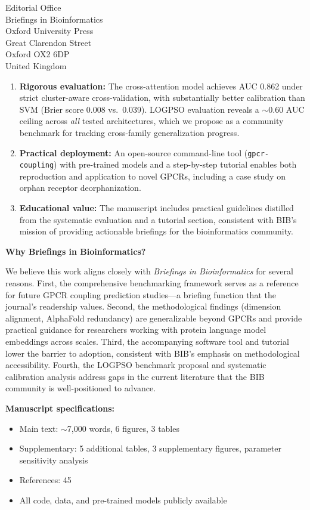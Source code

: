 \documentclass[11pt]{letter}
\begin{document}
\begin{letter}{Editorial Office\\
Briefings in Bioinformatics\\
Oxford University Press\\
Great Clarendon Street\\
Oxford OX2 6DP\\
United Kingdom}
\begin{enumerate}
    \item \textbf{Rigorous evaluation:} The cross-attention model achieves AUC 0.862 under strict cluster-aware cross-validation, with substantially better calibration than SVM (Brier score 0.008 vs.\ 0.039). LOGPSO evaluation reveals a $\sim$0.60 AUC ceiling across \textit{all} tested architectures, which we propose as a community benchmark for tracking cross-family generalization progress.

    \item \textbf{Practical deployment:} An open-source command-line tool (\texttt{gpcr-coupling}) with pre-trained models and a step-by-step tutorial enables both reproduction and application to novel GPCRs, including a case study on orphan receptor deorphanization.

    \item \textbf{Educational value:} The manuscript includes practical guidelines distilled from the systematic evaluation and a tutorial section, consistent with BIB's mission of providing actionable briefings for the bioinformatics community.
\end{enumerate}

\textbf{Why Briefings in Bioinformatics?}

We believe this work aligns closely with \textit{Briefings in Bioinformatics} for several reasons. First, the comprehensive benchmarking framework serves as a reference for future GPCR coupling prediction studies---a briefing function that the journal's readership values. Second, the methodological findings (dimension alignment, AlphaFold redundancy) are generalizable beyond GPCRs and provide practical guidance for researchers working with protein language model embeddings across scales. Third, the accompanying software tool and tutorial lower the barrier to adoption, consistent with BIB's emphasis on methodological accessibility. Fourth, the LOGPSO benchmark proposal and systematic calibration analysis address gaps in the current literature that the BIB community is well-positioned to advance.

\textbf{Manuscript specifications:}

\begin{itemize}
    \item Main text: $\sim$7,000 words, 6 figures, 3 tables
    \item Supplementary: 5 additional tables, 3 supplementary figures, parameter sensitivity analysis
    \item References: 45
    \item All code, data, and pre-trained models publicly available
\end{itemize}


\end{letter}
\end{document}
